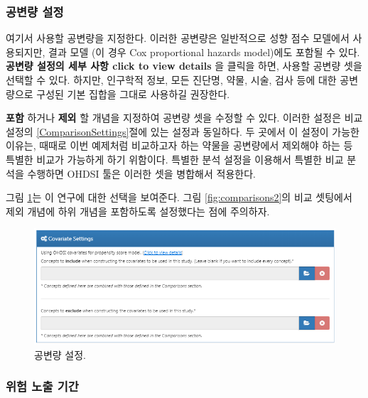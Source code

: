 \documentclass[11pt]{book}
\theoremstyle{definition}
\theoremstyle{definition}
\theoremstyle{definition}
\theoremstyle{remark}
\begin{document}
\subsubsection*{공변량 설정}\label{-}

여기서 사용할 공변량을 지정한다. 이러한 공변량은 일반적으로 성향 점수
모델에서 사용되지만, 결과 모델 (이 경우 Cox proportional hazards
model)에도 포함될 수 있다. \textbf{공변량 설정의 세부 사항 click to view
details} 을 클릭을 하면, 사용할 공변량 셋을 선택할 수 있다. 하지만,
인구학적 정보, 모든 진단명, 약물, 시술, 검사 등에 대한 공변량으로 구성된
기본 집합을 그대로 사용하길 권장한다.

\textbf{포함} 하거나 \textbf{제외} 할 개념을 지정하여 공변량 셋을 수정할
수 있다. 이러한 설정은 비교 설정의 \ref{ComparisonSettings}절에 있는
설정과 동일하다. 두 곳에서 이 설정이 가능한 이유는, 때때로 이번 예제처럼
비교하고자 하는 약물을 공변량에서 제외해야 하는 등 특별한 비교가
가능하게 하기 위함이다. 특별한 분석 설정을 이용해서 특별한 비교 분석을
수행하면 OHDSI 툴은 이러한 셋을 병합해서 적용한다.

그림 \ref{fig:covariateSettings}는 이 연구에 대한 선택을 보여준다. 그림
\ref{fig:comparisons2}의 비교 셋팅에서 제외 개념에 하위 개념을
포함하도록 설정했다는 점에 주의하자.

\begin{figure}

{\centering \includegraphics[width=1\linewidth]{images/PopulationLevelEstimation/covariateSettings} 

}

\caption{공변량 설정.}\label{fig:covariateSettings}
\end{figure}

\subsubsection*{위험 노출 기간}\label{--}
\end{document}
